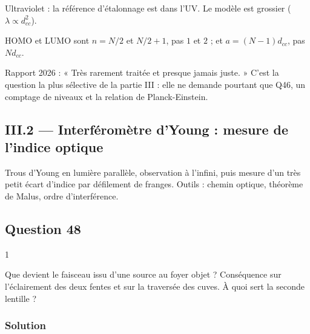 \documentclass[11pt,a4paper]{article}
\newcommand{\equationajustee}[1]{%
  \sbox{\boiteequation}{$\displaystyle #1$}%
  \ifdim\wd\boiteequation>\linewidth
    \[\resizebox{\linewidth}{!}{\usebox{\boiteequation}}\]%
  \else
    \[#1\]%
  \fi}
\begin{document}
\equationajustee{\boxed{\lambda\sim6\cdot10^{-8}\ \text{m}=60\ \text{nm}}}

Ultraviolet : la référence d'étalonnage est dans l'UV. Le modèle est grossier (\(\lambda\propto d_{cc}^2\)).

\begin{piege}

HOMO et LUMO sont \(n=N/2\) et \(N/2+1\), pas \(1\) et \(2\) ; et \(a=(N-1)d_{cc}\), pas \(Nd_{cc}\).

\end{piege}

\begin{jury}

Rapport 2026 : « Très rarement traitée et presque jamais juste. » C'est la question la plus sélective de la partie III : elle ne demande pourtant que Q46, un comptage de niveaux et la relation de Planck-Einstein.

\end{jury}

\hypertarget{iii.2-interfuxe9romuxe8tre-dyoung-mesure-de-lindice-optique}{%
\subsection{III.2 --- Interféromètre d'Young : mesure de l'indice optique}\label{iii.2-interfuxe9romuxe8tre-dyoung-mesure-de-lindice-optique}}

Trous d'Young en lumière parallèle, observation à l'infini, puis mesure d'un très petit écart d'indice par défilement de franges. Outils : chemin optique, théorème de Malus, ordre d'interférence.

\hypertarget{question-48}{%
\subsection{Question 48}\label{question-48}}

\begin{indication}{1}

Que devient le faisceau issu d'une source au foyer objet ? Conséquence sur l'éclairement des deux fentes et sur la traversée des cuves. À quoi sert la seconde lentille ?

\end{indication}

\hypertarget{solution-47}{%
\subsubsection{Solution}\label{solution-47}}
\end{document}
